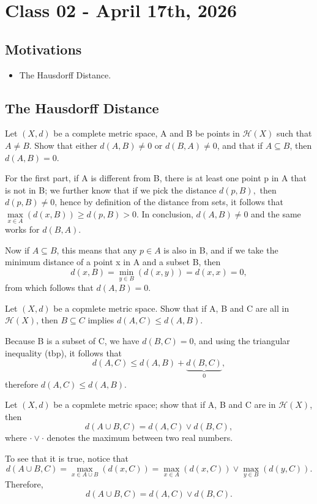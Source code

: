 \documentclass[../fractals_everywhere.tex]{subfiles}
\begin{document}
\section{Class 02 - April 17th, 2026}
\subsection{Motivations}
\begin{itemize}
	\item The Hausdorff Distance.
\end{itemize}
\subsection{The Hausdorff Distance}
\begin{exr}
	Let \((X, d)\) be a complete metric space, A and B be points in \(\mathcal{H}(X)\) such that \(A\neq B\). Show that either \(d(A,B)\neq 0\) or \(d(B, A) \neq 0\), and that if \(A\subseteq B\), then \(d(A, B) = 0.\)

	For the first part, if A is different from B, there is at least one point p in A that is not in B; we further know that if we pick the distance \(d(p, B),\) then \(d(p, B)\neq 0\), hence by definition of the distance from sets, it follows that \(\max\limits_{x\in A}(d(x, B))\geq d(p, B) > 0\). In conclusion, \(d(A, B)\neq 0\) and the same works for \(d(B, A)\).

	Now if \(A\subseteq B\), this means that any \(p\in A\) is also in B, and if we take the minimum distance of a point x in A and a subset B, then
	\[
		d(x, B) = \min\limits_{y\in B}(d(x, y)) = d(x, x) = 0,
	\]
	from which follows that \(d(A, B) = 0.\)
\end{exr}
\begin{exr}
	Let \((X, d)\) be a copmlete metric space. Show that if A, B and C are all in \(\mathcal{H}(X)\), then \(B\subseteq C\) implies \(d(A, C)\leq d(A, B)\).

	Because B is a subset of C, we have \(d(B, C) = 0\), and using the triangular inequality (tbp), it follows that
	\[
		d(A, C) \leq d(A, B) + \underbrace{d(B, C)}_{0},
	\]
	therefore \(d(A, C)\leq d(A, B).\)
\end{exr}
\begin{exr}
	Let \((X, d)\) be a copmlete metric space; show that if A, B and C are in \(\mathcal{H}(X)\), then
	\[
		d(A\cup B, C) = d(A, C) \vee d(B, C),
	\]
	where \(\cdot \vee \cdot \) denotes the maximum between two real numbers.

	To see that it is true, notice that
	\[
		d(A\cup B, C) = \max\limits_{x\in A\cup B}(d(x, C)) = \max\limits_{x\in A}(d(x, C)) \vee \max\limits_{y\in B}(d(y, C)).
	\]
	Therefore,
	\[
		d(A\cup B, C) = d(A, C)\vee d(B, C).
	\]
\end{exr}
\end{document}
